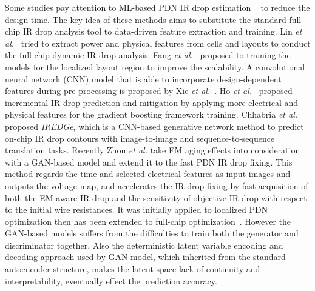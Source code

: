 Some studies pay attention to ML-based PDN IR drop estimation ~\cite{LinFang:2018vts,Fang:2018dynireco,HoKahng:ICCAD'19,Xie:2020powernet,Sachin:ASPDAC'21} to reduce the design time. 
The key idea of these methods aims to substitute the standard full-chip IR drop analysis tool to data-driven feature extraction and training. 
Lin {\it et al.}~\cite{LinFang:2018vts} tried to extract power and physical features from cells and layouts to conduct the full-chip dynamic IR drop analysis. Fang {\it et al.}~\cite{Fang:2018dynireco} proposed to training the models for the localized layout region to improve the scalability.  A convolutional neural network (CNN) model that is able to incorporate design-dependent features during pre-processing is proposed by Xie {\it et al.}~\cite{Xie:2020powernet}. Ho {\it et al.}~\cite{HoKahng:ICCAD'19} proposed incremental IR drop prediction and mitigation by applying more electrical and physical features for the gradient boosting framework training. Chhabria {\it et al.}~\cite{Sachin:ASPDAC'21} proposed {\it IREDGe}, which is a CNN-based generative network method to predict on-chip IR drop contours with image-to-image and sequence-to-sequence translation tasks. 
 Recently Zhou {\it et al.} \cite{ZhouJin:ICCAD'20} take EM aging effects into consideration with a GAN-based model and extend it to the fast PDN IR drop fixing.  This method regards the time and selected electrical features as input images and outputs the voltage map, and accelerates the IR drop fixing by fast acquisition of both the EM-aware IR drop and the sensitivity of objective IR-drop with respect to the initial wire resistances. It was initially applied to localized PDN optimization then has been extended to full-chip optimization~\cite{HanLiu:TCAD'22-23}.
However the GAN-based models suffers from the difficulties to train both the generator and discriminator together. Also the deterministic latent variable encoding and decoding approach used by GAN model, which inherited from the standard autoencoder structure, makes the latent space lack of continuity and interpretability, eventually effect the prediction accuracy. 



